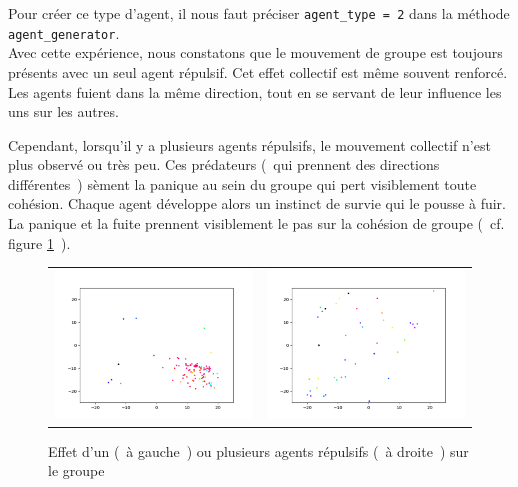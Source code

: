 \documentclass[french, a4paper, 12pt, openany]{report}
\begin{document}
       Pour créer ce type d'agent, il nous faut préciser \verb|agent_type = 2| dans la méthode \verb|agent_generator|.\\
       
       Avec cette expérience, nous constatons que le mouvement de groupe est toujours présents avec un seul agent répulsif. Cet effet collectif est même souvent renforcé. Les agents fuient dans la même direction, tout en se servant de leur influence les uns sur les autres.
       
        Cependant, lorsqu'il y a plusieurs agents répulsifs, le mouvement collectif n'est plus observé ou très peu. Ces prédateurs (~qui prennent des directions différentes~)  sèment la panique au sein du groupe qui pert visiblement toute cohésion. Chaque agent développe alors un instinct de survie qui le pousse à fuir. La panique et la fuite prennent visiblement le pas sur la cohésion de groupe (~cf. figure \ref{repulsifs_agents}~).\\
       
     \begin{figure}[!h]
		\centering
		\begin{tabular}{cc}
			\includegraphics[width=8cm]{images/image_17.png} & \includegraphics[width=8cm]{images/image_16.png} \\
		\end{tabular}
		\caption{Effet d'un (~à gauche~) ou plusieurs agents répulsifs (~à droite~) sur le groupe}
		\label{repulsifs_agents}
	\end{figure}
       
\end{document}
